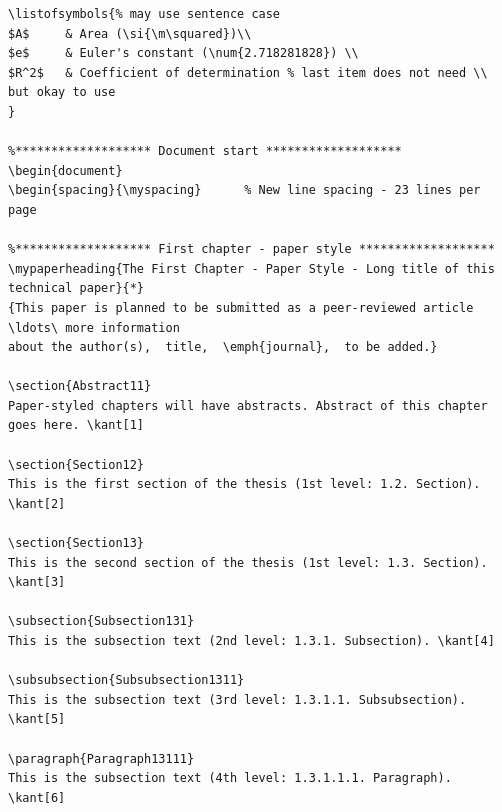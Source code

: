 \documentclass{article}
\begin{document}
{\begin{verbatim}
\listofsymbols{% may use sentence case
$A$     & Area (\si{\m\squared})\\
$e$     & Euler's constant (\num{2.718281828}) \\
$R^2$   & Coefficient of determination % last item does not need \\  but okay to use
}

%******************* Document start *******************
\begin{document}
\begin{spacing}{\myspacing}      % New line spacing - 23 lines per page

%******************* First chapter - paper style *******************
\mypaperheading{The First Chapter - Paper Style - Long title of this technical paper}{*}
{This paper is planned to be submitted as a peer-reviewed article \ldots\ more information 
about the author(s),  title,  \emph{journal},  to be added.}

\section{Abstract11}
Paper-styled chapters will have abstracts. Abstract of this chapter goes here. \kant[1]

\section{Section12}
This is the first section of the thesis (1st level: 1.2. Section). \kant[2]

\section{Section13}
This is the second section of the thesis (1st level: 1.3. Section). \kant[3]

\subsection{Subsection131}
This is the subsection text (2nd level: 1.3.1. Subsection). \kant[4]

\subsubsection{Subsubsection1311}
This is the subsection text (3rd level: 1.3.1.1. Subsubsection). \kant[5]

\paragraph{Paragraph13111}
This is the subsection text (4th level: 1.3.1.1.1. Paragraph). \kant[6]


\end{verbatim}}
\end{document}
